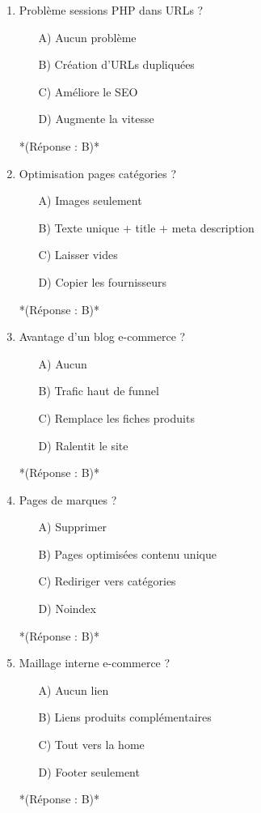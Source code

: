 \documentclass[12pt,a4paper,twoside]{report}
\begin{document}
\begin{enumerate}
\item Problème sessions PHP dans URLs ?
\begin{itemize}
\item[A)] Aucun problème
\item[B)] Création d'URLs dupliquées
\item[C)] Améliore le SEO
\item[D)] Augmente la vitesse
\end{itemize}
*(Réponse : B)*

\item Optimisation pages catégories ?
\begin{itemize}
\item[A)] Images seulement
\item[B)] Texte unique + title + meta description
\item[C)] Laisser vides
\item[D)] Copier les fournisseurs
\end{itemize}
*(Réponse : B)*

\item Avantage d'un blog e-commerce ?
\begin{itemize}
\item[A)] Aucun
\item[B)] Trafic haut de funnel
\item[C)] Remplace les fiches produits
\item[D)] Ralentit le site
\end{itemize}
*(Réponse : B)*

\item Pages de marques ?
\begin{itemize}
\item[A)] Supprimer
\item[B)] Pages optimisées contenu unique
\item[C)] Rediriger vers catégories
\item[D)] Noindex
\end{itemize}
*(Réponse : B)*

\item Maillage interne e-commerce ?
\begin{itemize}
\item[A)] Aucun lien
\item[B)] Liens produits complémentaires
\item[C)] Tout vers la home
\item[D)] Footer seulement
\end{itemize}
*(Réponse : B)*


\end{enumerate}
\end{document}
